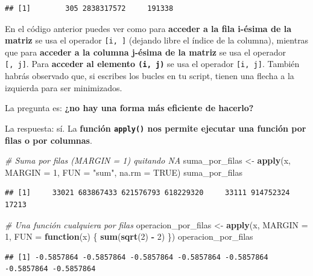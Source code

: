 \documentclass[11pt,]{book}
\newenvironment{Shaded}{\begin{snugshade}}{\end{snugshade}}
\newcommand{\CommentTok}[1]{\textcolor[rgb]{0.37,0.37,0.37}{\textit{#1}}}
\newcommand{\ControlFlowTok}[1]{\textcolor[rgb]{0.27,0.27,0.27}{\textbf{#1}}}
\newcommand{\DataTypeTok}[1]{\textcolor[rgb]{0.27,0.27,0.27}{#1}}
\newcommand{\DecValTok}[1]{\textcolor[rgb]{0.06,0.06,0.06}{#1}}
\newcommand{\KeywordTok}[1]{\textcolor[rgb]{0.27,0.27,0.27}{\textbf{#1}}}
\newcommand{\NormalTok}[1]{#1}
\newcommand{\OperatorTok}[1]{\textcolor[rgb]{0.43,0.43,0.43}{\textbf{#1}}}
\newcommand{\OtherTok}[1]{\textcolor[rgb]{0.37,0.37,0.37}{#1}}
\newcommand{\StringTok}[1]{\textcolor[rgb]{0.5,0.5,0.5}{#1}}
\begin{document}
\begin{verbatim}
## [1]        305 2838317572     191338
\end{verbatim}

En el código anterior puedes ver como para \textbf{acceder a la fila i-ésima de la matriz} se usa el operador \texttt{{[}i,\ {]}} (dejando libre el índice de la columna), mientras que para \textbf{acceder a la columna j-ésima de la matriz} se usa el operador \texttt{{[},\ j{]}}. Para \textbf{acceder al elemento \texttt{(i,\ j)}} se usa el operador \texttt{{[}i,\ j{]}}. También habrás observado que, si escribes los bucles en tu script, tienen una flecha a la izquierda para ser minimizados.

La pregunta es: \textbf{¿no hay una forma más eficiente de hacerlo?}

La respuesta: sí. La \textbf{función \texttt{apply()} nos permite ejecutar una función por filas o por columnas}.

\begin{Shaded}
\begin{Highlighting}[]
\CommentTok{# Suma por filas (MARGIN = 1) quitando NA}
\NormalTok{suma_por_filas <-}\StringTok{ }\KeywordTok{apply}\NormalTok{(x, }\DataTypeTok{MARGIN =} \DecValTok{1}\NormalTok{, }\DataTypeTok{FUN =} \StringTok{"sum"}\NormalTok{, }\DataTypeTok{na.rm =} \OtherTok{TRUE}\NormalTok{)}
\NormalTok{suma_por_filas }
\end{Highlighting}
\end{Shaded}

\begin{verbatim}
## [1]     33021 683867433 621576793 618229320     33111 914752324     17213
\end{verbatim}

\begin{Shaded}
\begin{Highlighting}[]
\CommentTok{# Una función cualquiera por filas}
\NormalTok{operacion_por_filas <-}\StringTok{ }\KeywordTok{apply}\NormalTok{(x, }\DataTypeTok{MARGIN =} \DecValTok{1}\NormalTok{, }\DataTypeTok{FUN =} \ControlFlowTok{function}\NormalTok{(x) \{ }\KeywordTok{sum}\NormalTok{(}\KeywordTok{sqrt}\NormalTok{(}\DecValTok{2}\NormalTok{) }\OperatorTok{-}\StringTok{ }\DecValTok{2}\NormalTok{) \})}
\NormalTok{operacion_por_filas}
\end{Highlighting}
\end{Shaded}

\begin{verbatim}
## [1] -0.5857864 -0.5857864 -0.5857864 -0.5857864 -0.5857864 -0.5857864 -0.5857864
\end{verbatim}
\end{document}
